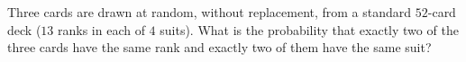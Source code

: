 Three cards are drawn at random, without replacement, from a standard $52$-card deck ($13$ ranks in each of $4$ suits). What is the probability that exactly two of the three cards have the same rank and exactly two of them have the same suit?
